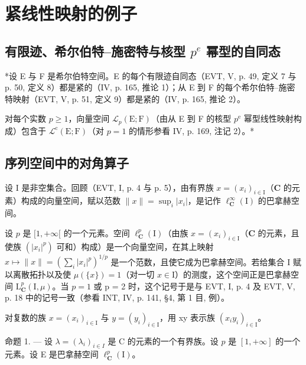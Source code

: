 \section{紧线性映射的例子}

\subsection{\texorpdfstring{有限迹、希尔伯特--施密特与核型 \(p^{e}\) 幂型的自同态}{有限迹、希尔伯特--施密特与核型 p\^{}\{e\} 幂型的自同态}}

*设 E 与 F 是希尔伯特空间。E 的每个有限迹自同态（EVT, V, p. 49, 定义 7 与 p. 50, 定义 8）都是紧的（IV, p. 165, 推论 1）；从 E 到 F 的每个希尔伯特--施密特映射（EVT, V, p. 51, 定义 9）都是紧的（IV, p. 165, 推论 2）。

对每个实数 \(p \geqslant 1\)，向量空间 \(\mathcal{L}_{p}(\mathrm{E};\mathrm{F})\)（由从 E 到 F 的核型 \(p^{\mathrm{e}}\) 幂型线性映射构成）包含于 \(\mathcal{L}^{\mathrm{c}}(\mathrm{E};\mathrm{F})\)（对 \(p = 1\) 的情形参看 IV, p. 169, 注记 2）。*

\subsection{序列空间中的对角算子}

设 I 是非空集合。回顾（EVT, I, p. 4 与 p. 5），由有界族 \(x = (x_i)_{i \in \mathrm{I}}\)（\(\mathbf{C}\) 的元素）构成的向量空间，赋以范数 \(\| x \| = \sup_i |x_i|\)，是记作 \(\ell_{\mathbf{C}}^{\infty}(\mathrm{I})\) 的巴拿赫空间。

设 \(p\) 是 \([1, +\infty[\) 的一个元素。空间 \(\ell_{\mathbf{C}}^{p}(\mathrm{I})\)（由族 \(x = (x_{i})_{i \in \mathrm{I}}\)（\(\mathbf{C}\) 的元素，且使族 \((|x_{i}|^{p})\) 可和）构成）是一个向量空间，在其上映射 \(x \mapsto \| x \| = (\sum_{i} |x_{i}|^{p})^{1/p}\) 是一个范数，且使它成为巴拿赫空间。若给集合 I 赋以离散拓扑以及使 \(\mu(\{x\}) = 1\)（对一切 \(x \in \mathrm{I}\)）的测度，这个空间正是巴拿赫空间 \(\mathrm{L}_{\mathbf{C}}^{p}(\mathrm{I}, \mu)\)。当 \(p = 1\) 或 p = 2 时，这个记号于是与 EVT, I, p. 4 及 EVT, V, p. 18 中的记号一致（参看 INT, IV, p. 141, §4, 第 1 目, 例）。

对复数的族 \(x = (x_{i})_{i \in \mathrm{I}}\) 与 \(y = (y_{i})_{i \in \mathrm{I}}\)，用 xy 表示族 \((x_{i}y_{i})_{i \in \mathrm{I}}\)。

命题 1. --- 设 \(\lambda = (\lambda_i)_{i\in I}\) 是 C 的元素的一个有界族。设 \(p\) 是 \([1, +\infty]\) 的一个元素。设 E 是巴拿赫空间 \(\ell_{\mathbf{C}}^p (\mathrm{I})\)。

